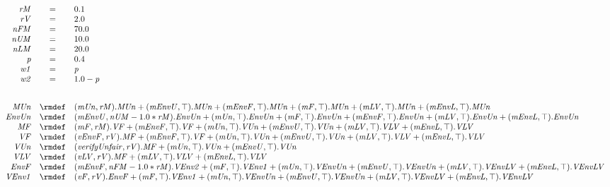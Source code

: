 \begin{displaymath}
	\begin{array}{rcl}
		\mathit{rM} & = & 0.1\\
		\mathit{rV} & = & 2.0\\
		\mathit{nFM} & = & 70.0\\
		\mathit{nUM} & = & 10.0\\
		\mathit{nLM} & = & 20.0\\
		\mathit{p} & = & 0.4\\
		\mathit{w1} & = & \mathit{p}\\
		\mathit{w2} & = & 1.0-\mathit{p}\\
[5.0ex]		\mathit{MUn} & \rmdef & (\mathit{mUn},\mathit{rM}).\mathit{MUn}+(\mathit{mEnvU},\top).\mathit{MUn}+(\mathit{mEnvF},\top).\mathit{MUn}+(\mathit{mF},\top).\mathit{MUn}+(\mathit{mLV},\top).\mathit{MUn}+(\mathit{mEnvL},\top).\mathit{MUn}\\
		\mathit{EnvUn} & \rmdef & (\mathit{mEnvU},\mathit{nUM}-1.0*\mathit{rM}).\mathit{EnvUn}+(\mathit{mUn},\top).\mathit{EnvUn}+(\mathit{mF},\top).\mathit{EnvUn}+(\mathit{mEnvF},\top).\mathit{EnvUn}+(\mathit{mLV},\top).\mathit{EnvUn}+(\mathit{mEnvL},\top).\mathit{EnvUn}\\
		\mathit{MF} & \rmdef & (\mathit{mF},\mathit{rM}).\mathit{VF}+(\mathit{mEnvF},\top).\mathit{VF}+(\mathit{mUn},\top).\mathit{VUn}+(\mathit{mEnvU},\top).\mathit{VUn}+(\mathit{mLV},\top).\mathit{VLV}+(\mathit{mEnvL},\top).\mathit{VLV}\\
		\mathit{VF} & \rmdef & (\mathit{vEnvF},\mathit{rV}).\mathit{MF}+(\mathit{mEnvF},\top).\mathit{VF}+(\mathit{mUn},\top).\mathit{VUn}+(\mathit{mEnvU},\top).\mathit{VUn}+(\mathit{mLV},\top).\mathit{VLV}+(\mathit{mEnvL},\top).\mathit{VLV}\\
		\mathit{VUn} & \rmdef & (\mathit{verifyUnfair},\mathit{rV}).\mathit{MF}+(\mathit{mUn},\top).\mathit{VUn}+(\mathit{mEnvU},\top).\mathit{VUn}\\
		\mathit{VLV} & \rmdef & (\mathit{vLV},\mathit{rV}).\mathit{MF}+(\mathit{mLV},\top).\mathit{VLV}+(\mathit{mEnvL},\top).\mathit{VLV}\\
		\mathit{EnvF} & \rmdef & (\mathit{mEnvF},\mathit{nFM}-1.0*\mathit{rM}).\mathit{VEnv2}+(\mathit{mF},\top).\mathit{VEnv1}+(\mathit{mUn},\top).\mathit{VEnvUn}+(\mathit{mEnvU},\top).\mathit{VEnvUn}+(\mathit{mLV},\top).\mathit{VEnvLV}+(\mathit{mEnvL},\top).\mathit{VEnvLV}\\
		\mathit{VEnv1} & \rmdef & (\mathit{vF},\mathit{rV}).\mathit{EnvF}+(\mathit{mF},\top).\mathit{VEnv1}+(\mathit{mUn},\top).\mathit{VEnvUn}+(\mathit{mEnvU},\top).\mathit{VEnvUn}+(\mathit{mLV},\top).\mathit{VEnvLV}+(\mathit{mEnvL},\top).\mathit{VEnvLV}\\

\end{array}
\end{displaymath}
